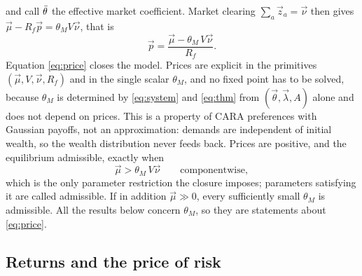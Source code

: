 %
and call $\bar\theta$ the effective market coefficient. Market clearing
$\sum_a\vec z_a=\vec\nu$ then gives $\vec\mu-R_f\vec p=\theta_MV\vec\nu$, that
is
%
\begin{equation}
\vec p=\frac{\vec\mu-\theta_M\,V\vec\nu}{R_f} .
\label{eq:price}
\end{equation}
%
Equation \eqref{eq:price} closes the model. Prices are explicit in the
primitives $(\vec\mu,V,\vec\nu,R_f)$ and in the single scalar $\theta_M$, and no
fixed point has to be solved, because $\theta_M$ is determined by
\eqref{eq:system} and \eqref{eq:thm} from $(\vec\theta,\vec\lambda,A)$ alone and
does not depend on prices. This is a property of CARA preferences with Gaussian
payoffs, not an approximation: demands are independent of initial wealth, so
the wealth distribution never feeds back. Prices are positive, and the
equilibrium admissible, exactly when
%
\begin{equation}
\vec\mu>\theta_M\,V\vec\nu
\qquad\text{componentwise},
\label{eq:positive}
\end{equation}
%
which is the only parameter restriction the closure imposes; parameters
satisfying it are called admissible. If in addition $\vec\mu\gg0$, every
sufficiently small $\theta_M$ is admissible. All the results below concern $\theta_M$, so
they are statements about \eqref{eq:price}.

\subsection{Returns and the price of risk}
\label{sec:returns}


